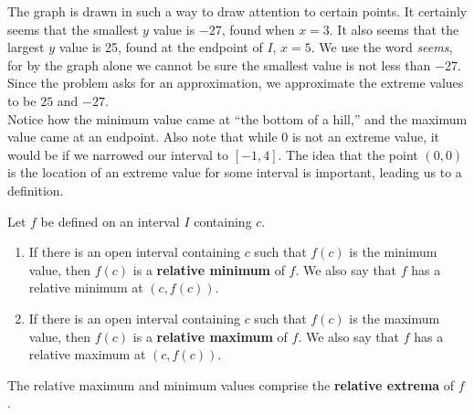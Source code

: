 {The graph is drawn in such a way to draw attention to certain points. It certainly seems that the smallest $y$ value is $-27$, found when $x=3$. It also seems that the largest $y$ value is 25, found at the endpoint of $I$, $x=5$. We use the word \textit{seems}, for by the graph alone we cannot be sure the smallest value is not less than $-27$. Since the problem asks for an approximation, we approximate the extreme values to be $25$ and $-27$.
}\\

Notice how the minimum value came at ``the bottom of a hill,'' and the maximum value came at an endpoint. Also note that while $0$ is not an extreme value, it would be if we narrowed our interval to $[-1,4]$. The idea that the point $(0,0)$ is the location of an extreme value for some interval is important, leading us to a definition.

\enlargethispage{2\baselineskip}

\setboxwidth{70pt}
\noindent\hskip-70pt
\noindent\begin{minipage}{\textwidth+100pt}
{}%
{Let $f$ be defined on an interval $I$ containing $c$. 
		\begin{enumerate}
		\item		If there is an open interval containing $c$ such that $f(c)$ is the minimum value, then $f(c)$ is a \textbf{relative minimum} of $f$. We also say that $f$ has a relative minimum at $(c,f(c))$. 
		\item		If there is an open interval containing $c$ such that $f(c)$ is the maximum value, then $f(c)$ is a \textbf{relative maximum} of $f$. We also say that $f$ has a relative maximum at $(c,f(c))$. 
		\end{enumerate}
		
The relative maximum and minimum values comprise the \textbf{relative extrema} of $f$.
}
\end{minipage}\\

